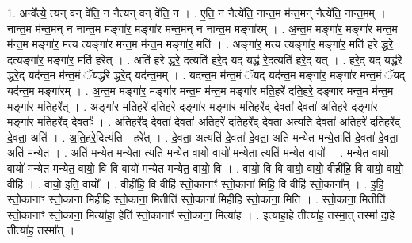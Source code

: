 \documentclass[17pt]{extarticle}
\begin{document}
1. अन्वे᳚त्ये॒ त्यन् वन् वे॑ति॒ न नैत्यन् वन् वे॑ति॒ न । . ए॒ति॒ न नैत्ये॑ति॒ नान्त॒म म॑न्त॒मन् नैत्ये॑ति॒ नान्त॒मम् । . नान्त॒म म॑न्त॒मन् न नान्त॒म मङ्गा॑र॒ मङ्गा॑र मन्त॒मन् न नान्त॒म मङ्गा॑रम् । . अ॒न्त॒म मङ्गा॑र॒ मङ्गा॑र मन्त॒म म॑न्त॒म मङ्गा॑र॒ मत्य त्यङ्गा॑र मन्त॒म म॑न्त॒म मङ्गा॑र॒ मति॑ । . अङ्गा॑र॒ मत्य त्यङ्गा॑र॒ मङ्गा॑र॒ मति॑ हरे द्धरे॒ दत्यङ्गा॑र॒ मङ्गा॑र॒ मति॑ हरेत् । . अति॑ हरे द्धरे॒ दत्यति॑ हरे॒द् यद् यद्ध॑ रे॒दत्यति॑ हरे॒द् यत् । . ह॒रे॒द् यद् यद्ध॑रे द्धरे॒द् यद॑न्त॒म म॑न्त॒मं ॅयद्ध॑रे द्धरे॒द् यद॑न्त॒मम् । . यद॑न्त॒म म॑न्त॒मं ॅयद् यद॑न्त॒म मङ्गा॑र॒ मङ्गा॑र मन्त॒मं ॅयद् यद॑न्त॒म मङ्गा॑रम् । . अ॒न्त॒म मङ्गा॑र॒ मङ्गा॑र मन्त॒म म॑न्त॒म मङ्गा॑र मति॒हरे॑ दति॒हरे॒ दङ्गा॑र मन्त॒म म॑न्त॒म मङ्गा॑र मति॒हरे᳚त् । . अङ्गा॑र मति॒हरे॑ दति॒हरे॒ दङ्गा॑र॒ मङ्गा॑र मति॒हरे᳚द् दे॒वता॑ दे॒वता॑ अति॒हरे॒ दङ्गा॑र॒ मङ्गा॑र मति॒हरे᳚द् दे॒वताः᳚ । . अ॒ति॒हरे᳚द् दे॒वता॑ दे॒वता॑ अति॒हरे॑ दति॒हरे᳚द् दे॒वता॒ अत्यति॑ दे॒वता॑ अति॒हरे॑ दति॒हरे᳚द् दे॒वता॒ अति॑ । . अ॒ति॒हरे॒दित्य॑ति - हरे᳚त् । . दे॒वता॒ अत्यति॑ दे॒वता॑ दे॒वता॒ अति॑ मन्येत मन्ये॒ताति॑ दे॒वता॑ दे॒वता॒ अति॑ मन्येत । . अति॑ मन्येत मन्ये॒ता त्यति॑ मन्येत॒ वायो॒ वायो॑ मन्ये॒ता त्यति॑ मन्येत॒ वायो᳚ । . म॒न्ये॒त॒ वायो॒ वायो॑ मन्येत मन्येत॒ वायो॒ वि वि वायो॑ मन्येत मन्येत॒ वायो॒ वि । . वायो॒ वि वि वायो॒ वायो॒ वीही॑हि॒ वि वायो॒ वायो॒ वीहि॑ । . वायो॒ इति॒ वायो᳚ । . वीही॑हि॒ वि वीहि॑ स्तो॒कानाꣳ॑ स्तो॒काना॑ मिहि॒ वि वीहि॑ स्तो॒काना᳚म् । . इ॒हि॒ स्तो॒कानाꣳ॑ स्तो॒काना॑ मिहीहि स्तो॒काना॒ मितीति॑ स्तो॒काना॑ मिहीहि स्तो॒काना॒ मिति॑ । . स्तो॒काना॒ मितीति॑ स्तो॒कानाꣳ॑ स्तो॒काना॒ मित्या॑हा॒ हेति॑ स्तो॒कानाꣳ॑ स्तो॒काना॒ मित्या॑ह । . इत्या॑हा॒हे तीत्या॑ह॒ तस्मा॒त् तस्मा॑ दा॒हे तीत्या॑ह॒ तस्मा᳚त् । \newline
\end{document}
